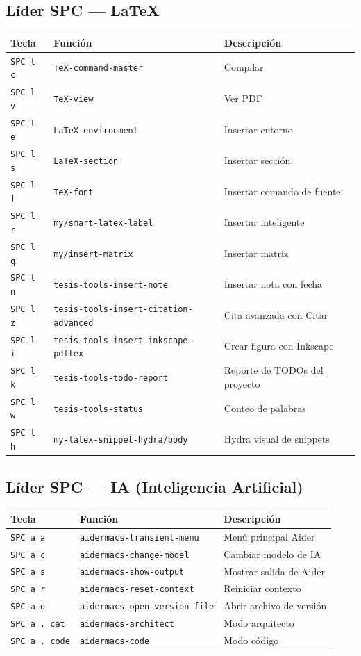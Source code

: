 \documentclass[11pt]{article}
\begin{document}
\subsection{Líder SPC — \LaTeX{}}
\label{sec:orgd5db2bb}
\begin{center}
\begin{tabular}{lll}
Tecla & Función & Descripción\\
\hline
\texttt{SPC l c} & \texttt{TeX-command-master} & Compilar\\
\texttt{SPC l v} & \texttt{TeX-view} & Ver PDF\\
\texttt{SPC l e} & \texttt{LaTeX-environment} & Insertar entorno\\
\texttt{SPC l s} & \texttt{LaTeX-section} & Insertar sección\\
\texttt{SPC l f} & \texttt{TeX-font} & Insertar comando de fuente\\
\texttt{SPC l r} & \texttt{my/smart-latex-label} & Insertar \label{} inteligente\\
\texttt{SPC l q} & \texttt{my/insert-matrix} & Insertar matriz\\
\texttt{SPC l n} & \texttt{tesis-tools-insert-note} & Insertar nota con fecha\\
\texttt{SPC l z} & \texttt{tesis-tools-insert-citation-advanced} & Cita avanzada con Citar\\
\texttt{SPC l i} & \texttt{tesis-tools-insert-inkscape-pdftex} & Crear figura con Inkscape\\
\texttt{SPC l k} & \texttt{tesis-tools-todo-report} & Reporte de TODOs del proyecto\\
\texttt{SPC l w} & \texttt{tesis-tools-status} & Conteo de palabras\\
\texttt{SPC l h} & \texttt{my-latex-snippet-hydra/body} & Hydra visual de snippets\\
\end{tabular}
\end{center}
\subsection{Líder SPC — IA (Inteligencia Artificial)}
\label{sec:org37745b8}
\begin{center}
\begin{tabular}{lll}
Tecla & Función & Descripción\\
\hline
\texttt{SPC a a} & \texttt{aidermacs-transient-menu} & Menú principal Aider\\
\texttt{SPC a c} & \texttt{aidermacs-change-model} & Cambiar modelo de IA\\
\texttt{SPC a s} & \texttt{aidermacs-show-output} & Mostrar salida de Aider\\
\texttt{SPC a r} & \texttt{aidermacs-reset-context} & Reiniciar contexto\\
\texttt{SPC a o} & \texttt{aidermacs-open-version-file} & Abrir archivo de versión\\
\texttt{SPC a . cat} & \texttt{aidermacs-architect} & Modo arquitecto\\
\texttt{SPC a . code} & \texttt{aidermacs-code} & Modo código\\
\end{tabular}
\end{center}
\end{document}
